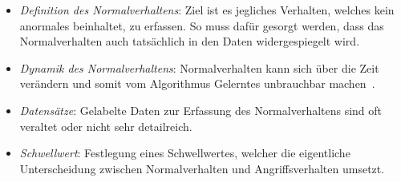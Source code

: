                 \begin{itemize}
                    \item \textit{Definition des Normalverhaltens}:
                        Ziel ist es jegliches Verhalten, welches kein anormales beinhaltet, zu erfassen.
                        So muss dafür gesorgt werden,
                        dass das Normalverhalten auch tatsächlich in den Daten widergespiegelt wird. 

                    \item \textit{Dynamik des Normalverhaltens}:
                        Normalverhalten kann sich über die Zeit verändern 
                        und somit vom Algorithmus Gelerntes unbrauchbar machen~\cite{ANOMALYSURVEY}.

                    \item \textit{Datensätze}:
                        Gelabelte Daten zur Erfassung des Normalverhaltens sind oft veraltet oder nicht sehr detailreich. 

                    \item \textit{Schwellwert}:
                        Festlegung eines Schwellwertes,
                        welcher die eigentliche Unterscheidung zwischen Normalverhalten und Angriffsverhalten umsetzt.
                \end{itemize}

